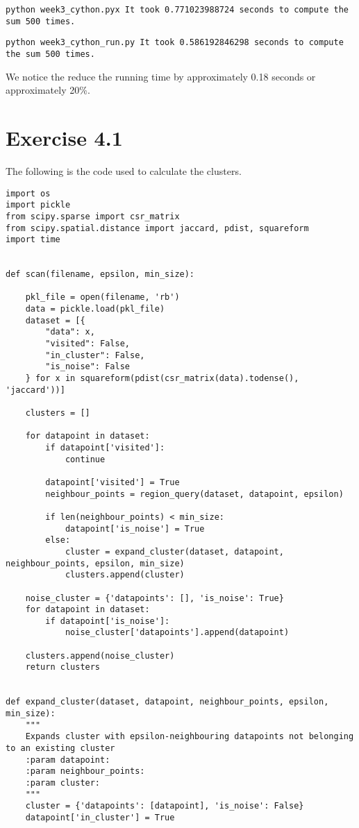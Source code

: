 \documentclass{article}
\begin{document}
\texttt{python week3\_cython.pyx It took 0.771023988724 seconds to compute the sum 500 times.}

\texttt{python week3\_cython\_run.py
It took 0.586192846298 seconds to compute the sum 500 times.}

We notice the reduce the running time by approximately 0.18 seconds or approximately 20\%.

\section{Exercise 4.1}

The following is the code used to calculate the clusters.

\begin{lstlisting}
import os
import pickle
from scipy.sparse import csr_matrix
from scipy.spatial.distance import jaccard, pdist, squareform
import time


def scan(filename, epsilon, min_size):

    pkl_file = open(filename, 'rb')
    data = pickle.load(pkl_file)
    dataset = [{
        "data": x,
        "visited": False,
        "in_cluster": False,
        "is_noise": False
    } for x in squareform(pdist(csr_matrix(data).todense(), 'jaccard'))]

    clusters = []

    for datapoint in dataset:
        if datapoint['visited']:
            continue

        datapoint['visited'] = True
        neighbour_points = region_query(dataset, datapoint, epsilon)

        if len(neighbour_points) < min_size:
            datapoint['is_noise'] = True
        else:
            cluster = expand_cluster(dataset, datapoint, neighbour_points, epsilon, min_size)
            clusters.append(cluster)

    noise_cluster = {'datapoints': [], 'is_noise': True}
    for datapoint in dataset:
        if datapoint['is_noise']:
            noise_cluster['datapoints'].append(datapoint)

    clusters.append(noise_cluster)
    return clusters


def expand_cluster(dataset, datapoint, neighbour_points, epsilon, min_size):
    """
    Expands cluster with epsilon-neighbouring datapoints not belonging to an existing cluster
    :param datapoint:
    :param neighbour_points:
    :param cluster:
    """
    cluster = {'datapoints': [datapoint], 'is_noise': False}
    datapoint['in_cluster'] = True


\end{lstlisting}
\end{document}
